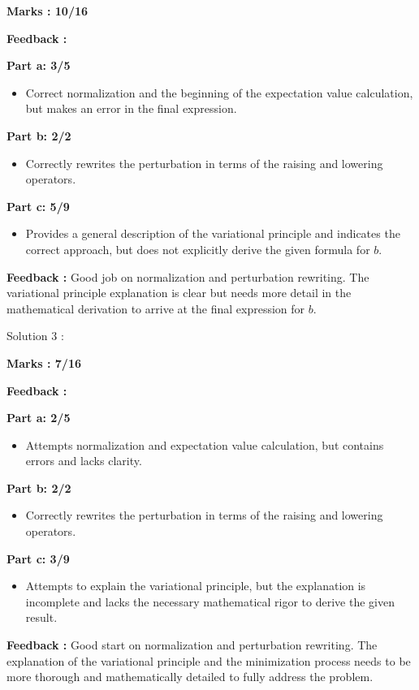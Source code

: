 \documentclass[a4paper,11pt]{article}
\begin{document}
\textbf{Marks : 10/16}

\textbf{Feedback :}

\textbf{Part a: 3/5}
\begin{itemize}
    \item Correct normalization and the beginning of the expectation value calculation, but makes an error in the final expression.
\end{itemize}

\textbf{Part b: 2/2}
\begin{itemize}
    \item Correctly rewrites the perturbation in terms of the raising and lowering operators.
\end{itemize}

\textbf{Part c: 5/9}
\begin{itemize}
    \item Provides a general description of the variational principle and indicates the correct approach, but does not explicitly derive the given formula for $b$.
\end{itemize}

\textbf{Feedback :}
Good job on normalization and perturbation rewriting. The variational principle explanation is clear but needs more detail in the mathematical derivation to arrive at the final expression for $b$.


Solution 3 :

\textbf{Marks : 7/16}

\textbf{Feedback :}

\textbf{Part a: 2/5}
\begin{itemize}
    \item Attempts normalization and expectation value calculation, but contains errors and lacks clarity.
\end{itemize}

\textbf{Part b: 2/2}
\begin{itemize}
    \item Correctly rewrites the perturbation in terms of the raising and lowering operators.
\end{itemize}

\textbf{Part c: 3/9}
\begin{itemize}
    \item Attempts to explain the variational principle, but the explanation is incomplete and lacks the necessary mathematical rigor to derive the given result.
\end{itemize}

\textbf{Feedback :}
Good start on normalization and perturbation rewriting. The explanation of the variational principle and the minimization process needs to be more thorough and mathematically detailed to fully address the problem.
\end{document}
